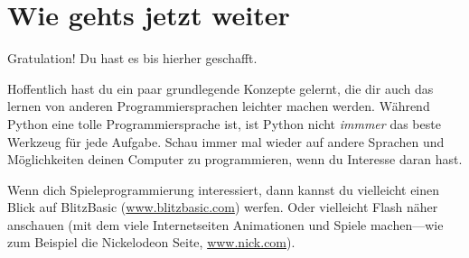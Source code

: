 

\chapter{Wie gehts jetzt weiter}

Gratulation! Du hast es bis hierher geschafft.
\par
\vspace{1em}
Hoffentlich hast du ein paar grundlegende Konzepte gelernt, die dir auch das lernen von anderen Programmiersprachen leichter machen werden. Während Python eine tolle Programmiersprache ist, ist Python nicht \emph{immmer} das beste Werkzeug für jede Aufgabe. Schau immer mal wieder auf andere Sprachen und Möglichkeiten deinen Computer zu programmieren, wenn du Interesse daran hast.

\vspace{1em}
Wenn dich Spieleprogrammierung interessiert, dann kannst du vielleicht einen Blick auf BlitzBasic (\href{http://www.blitzbasic.com}{www.blitzbasic.com}) werfen. Oder vielleicht Flash näher anschauen (mit dem viele Internetseiten Animationen und Spiele machen---wie zum Beispiel die Nickelodeon Seite, \href{http://www.nick.com}{www.nick.com}).

